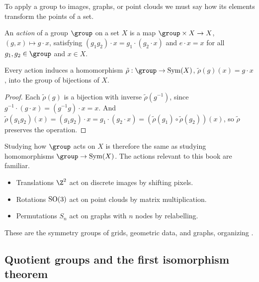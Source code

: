 To apply a group to images, graphs, or point clouds we must say how its elements
transform the points of a set.

\begin{definition}
\label{def:found:action}
An \emph{action} of a group $\group$ on a set $X$ is a map
$\group \times X \to X$, $(g, x) \mapsto g \cdot x$, satisfying
$(g_1 g_2) \cdot x = g_1 \cdot (g_2 \cdot x)$ and $e \cdot x = x$ for all
$g_1, g_2 \in \group$ and $x \in X$.
\end{definition}

\begin{proposition}
\label{prop:found:action-hom}
Every action induces a homomorphism $\tilde\rho : \group \to \Sym(X)$,
$\tilde\rho(g)(x) = g \cdot x$, into the group of bijections of $X$.
\end{proposition}

\begin{proof}
Each $\tilde\rho(g)$ is a bijection with inverse $\tilde\rho(g^{-1})$, since
$g^{-1}\cdot(g\cdot x) = (g^{-1}g)\cdot x = x$. And $\tilde\rho(g_1 g_2)(x) =
(g_1 g_2)\cdot x = g_1\cdot(g_2\cdot x) = (\tilde\rho(g_1)\circ\tilde\rho(g_2))(x)$,
so $\tilde\rho$ preserves the operation.
\end{proof}

Studying how $\group$ acts on $X$ is therefore the same as studying
homomorphisms $\group \to \Sym(X)$. The actions relevant to this book are
familiar.

\begin{example}
\label{ex:found:actions}
\leavevmode
\begin{itemize}
  \item Translations $\Z^2$ act on discrete images by shifting pixels.
  \item Rotations $\operatorname{SO}(3)$ act on point clouds by matrix multiplication.
  \item Permutations $S_n$ act on graphs with $n$ nodes by relabelling.
\end{itemize}
These are the symmetry groups of grids, geometric data, and graphs, organizing
.
\end{example}

\subsection{Quotient groups and the first isomorphism theorem}
\label{sec:found:quotients}

